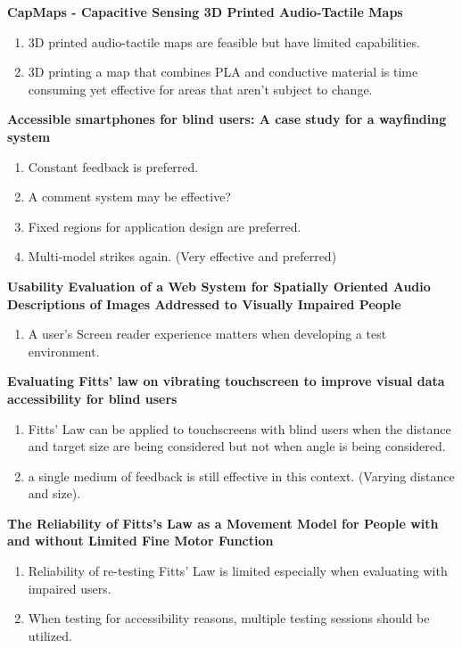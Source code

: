 \documentclass{article}
\begin{document}
\cite{} \textbf{CapMaps - Capacitive Sensing 3D Printed Audio-Tactile Maps } \cite{}

\begin{enumerate}
    \item 3D printed audio-tactile maps are feasible but have limited capabilities. 
    \item 3D printing a map that combines PLA and conductive material is time consuming yet effective for areas that aren't subject to change. 
\end{enumerate}

\cite{} \textbf{Accessible smartphones for blind users: A case study for a wayfinding system } \cite{}

\begin{enumerate}
    \item Constant feedback is preferred.
    \item A comment system may be effective?
    \item Fixed regions for application design are preferred. 
    \item Multi-model strikes again. (Very effective and preferred) 
\end{enumerate}

\cite{} \textbf{Usability Evaluation of a Web System for Spatially Oriented Audio Descriptions of Images Addressed to Visually Impaired People } \cite{}

\begin{enumerate}
    \item A user's Screen reader experience matters when developing a test environment.
\end{enumerate}

\cite{} \textbf{Evaluating Fitts’ law on vibrating touchscreen to improve visual data accessibility for blind users } \cite{}

\begin{enumerate}
    \item Fitts' Law can be applied to touchscreens with blind users when the distance and target size are being considered but not when angle is being considered. 
    \item a single medium of feedback is still effective in this context. (Varying distance and size).
\end{enumerate}

\cite{} \textbf{The Reliability of Fitts’s Law as a Movement Model for People with and without Limited Fine Motor Function } \cite{}

\begin{enumerate}
    \item Reliability of re-testing Fitts' Law is limited especially when evaluating with impaired users. 
    \item When testing for accessibility reasons, multiple testing sessions should be utilized. 
\end{enumerate}
\end{document}
